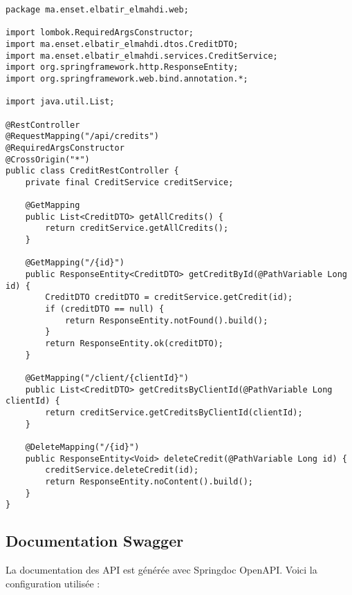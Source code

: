 \begin{lstlisting}[caption=Contrôleur REST pour Credit]
package ma.enset.elbatir_elmahdi.web;

import lombok.RequiredArgsConstructor;
import ma.enset.elbatir_elmahdi.dtos.CreditDTO;
import ma.enset.elbatir_elmahdi.services.CreditService;
import org.springframework.http.ResponseEntity;
import org.springframework.web.bind.annotation.*;

import java.util.List;

@RestController
@RequestMapping("/api/credits")
@RequiredArgsConstructor
@CrossOrigin("*")
public class CreditRestController {
    private final CreditService creditService;

    @GetMapping
    public List<CreditDTO> getAllCredits() {
        return creditService.getAllCredits();
    }

    @GetMapping("/{id}")
    public ResponseEntity<CreditDTO> getCreditById(@PathVariable Long id) {
        CreditDTO creditDTO = creditService.getCredit(id);
        if (creditDTO == null) {
            return ResponseEntity.notFound().build();
        }
        return ResponseEntity.ok(creditDTO);
    }

    @GetMapping("/client/{clientId}")
    public List<CreditDTO> getCreditsByClientId(@PathVariable Long clientId) {
        return creditService.getCreditsByClientId(clientId);
    }

    @DeleteMapping("/{id}")
    public ResponseEntity<Void> deleteCredit(@PathVariable Long id) {
        creditService.deleteCredit(id);
        return ResponseEntity.noContent().build();
    }
}
\end{lstlisting}

\subsection{Documentation Swagger}
La documentation des API est générée avec Springdoc OpenAPI. Voici la configuration utilisée :

